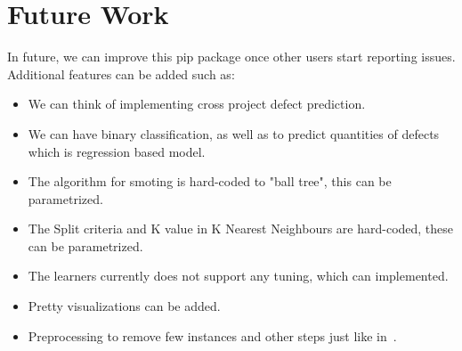 \documentclass[conference]{IEEEtran}
\begin{document}
\section{Future Work}
\label{future}
In future, we can improve this pip package once other users start reporting issues. Additional features can be added such as:
\begin{itemize}
 \item We can think of implementing cross project defect prediction.
 \item We can have binary classification, as well as to predict quantities of defects which is regression based model.
 \item The algorithm for smoting is hard-coded to "ball tree", this can be parametrized.
 \item The Split criteria and K value in K Nearest Neighbours are hard-coded, these can be parametrized.
 \item The learners currently does not support any tuning, which can implemented.
 \item Pretty visualizations can be added.
 \item Preprocessing to remove few instances and other steps just like in~\cite{gray2009using}.
\end{itemize}

\balance


\medskip

\end{document}
